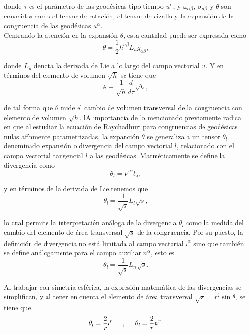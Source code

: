 \documentclass[16pt,a4paper]{article}
\numberwithin{equation}{section}
\theoremstyle{definition}
\begin{document}
donde $\tau$ es el parámetro de las geodésicas tipo tiempo $u^\alpha$, y $\omega_{\alpha \beta}$, $\sigma_{\alpha \beta}$ y $\theta$ son conocidos como el tensor de rotación, el tensor de cizalla y la expansión de la congruencia de las geodésicas $u^\alpha$.\\

Centrando la atención en la expansión $\theta$, esta cantidad puede ser expresada como
\begin{equation*}
\theta = \frac{1}{2}h^{\alpha \beta}L_ug_{\alpha \beta},
\end{equation*}

donde $L_u$ denota la derivada de Lie a lo largo del campo vectorial $u$. Y en términos del elemento de volumen $\sqrt{h}$ se tiene que \cite{blau}
\begin{equation*}
\theta = \frac{1}{\sqrt{h}}\frac{d}{d\tau}\sqrt{h},
\end{equation*}

de tal forma que $\theta$ mide el cambio de volumen transversal de la congruencia con elemento de volumen $\sqrt{h}$. lA importancia de lo mencionado previamente radica en que al estudiar la ecuación de Raychadhuri para congruencias de geodésicas nulas afínmente parametrizadas, la expanción $\theta$ se generaliza a un tensor $\theta_l$ denominado expansión o divergencia del campo vectorial $l$, relacionado con el campo vectorial tangencial $l$ a las geodésicas. Matméticamente se define la divergencia como 
\begin{equation*}
\theta_l = \nabla^\alpha l_\alpha,
\end{equation*}

y en términos de la derivada de Lie tenemos que
\begin{equation*}
\theta_l = \frac{1}{\sqrt{s}}L_l\sqrt{s},
\end{equation*}

lo cual permite la interpretación análoga de la divergencia $\theta_l$ como la medida del cambio del elemento de área transversal $\sqrt{s}$ de la congruencia. Por su puesto, la definición de divergencia no está limitada al campo vectorial $l^\alpha$ sino que también se define análogamente para el campo auxiliar $n^\alpha$, esto es
\begin{equation*}
\theta_l = \frac{1}{\sqrt{s}}L_n\sqrt{s}.
\end{equation*}

Al trabajar con simetría esférica, la expresión matemática de las divergencias se simplifican, y al tener en cuenta el elemento de área transversal $\sqrt{s} = r^2 \sin \theta$, se tiene que 
\begin{equation}
\label{divergences}
\theta_l = \frac{2}{r}l^r \hspace{.5cm},\hspace{.5cm} \theta_l = \frac{2}{r}n^r.
\end{equation}
\end{document}
